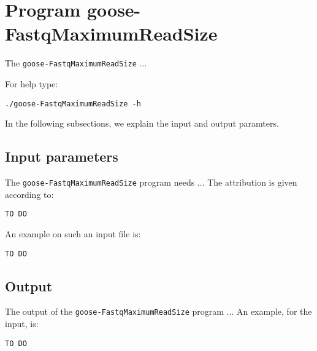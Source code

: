\section{Program goose-FastqMaximumReadSize}
The \texttt{goose-FastqMaximumReadSize} ...

For help type:
\begin{lstlisting}
./goose-FastqMaximumReadSize -h
\end{lstlisting}
In the following subsections, we explain the input and output paramters.

\subsection{Input parameters}

The \texttt{goose-FastqMaximumReadSize} program needs ...
The attribution is given according to:
\begin{lstlisting}
TO DO
\end{lstlisting}

An example on such an input file is:
\begin{lstlisting}
TO DO
\end{lstlisting}

\subsection{Output}
The output of the \texttt{goose-FastqMaximumReadSize} program ...
An example, for the input, is:
\begin{lstlisting}
TO DO
\end{lstlisting}
